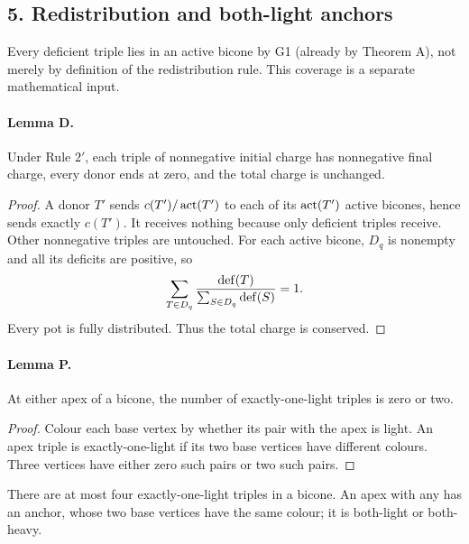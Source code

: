 \subsection*{5. Redistribution and both-light anchors}
Every deficient triple lies in an active bicone by G1 (already by Theorem A), not merely by definition of the redistribution rule. This coverage is a separate mathematical input.

\paragraph{Lemma D.} Under Rule $2'$, each triple of nonnegative initial charge has nonnegative final charge, every donor ends at zero, and the total charge is unchanged.
\begin{proof}
A donor $T'$ sends $c(T')/\operatorname{act}(T')$ to each of its $\operatorname{act}(T')$ active bicones, hence sends exactly $c(T')$. It receives nothing because only deficient triples receive. Other nonnegative triples are untouched. For each active bicone, $D_q$ is nonempty and all its deficits are positive, so
\[
 \sum_{T\in D_q}\frac{\operatorname{def}(T)}{\sum_{S\in D_q}\operatorname{def}(S)}=1.
\]
Every pot is fully distributed. Thus the total charge is conserved.
\end{proof}
\paragraph{Lemma P.} At either apex of a bicone, the number of exactly-one-light triples is zero or two.
\begin{proof}
Colour each base vertex by whether its pair with the apex is light. An apex triple is exactly-one-light if its two base vertices have different colours. Three vertices have either zero such pairs or two such pairs.
\end{proof}
There are at most four exactly-one-light triples in a bicone. An apex with any has an anchor, whose two base vertices have the same colour; it is both-light or both-heavy.


